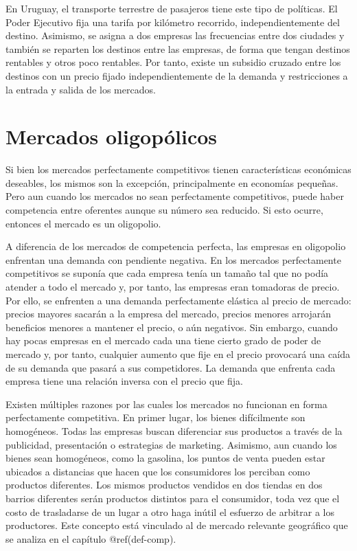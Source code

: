 \documentclass[
  12pt,
  spanish,
]{book}
\begin{document}
En Uruguay, el transporte terrestre de pasajeros tiene este tipo de
políticas. El Poder Ejecutivo fija una tarifa por kilómetro recorrido,
independientemente del destino. Asimismo, se asigna a dos empresas las
frecuencias entre dos ciudades y también se reparten los destinos entre
las empresas, de forma que tengan destinos rentables y otros poco
rentables. Por tanto, existe un subsidio cruzado entre los destinos con
un precio fijado independientemente de la demanda y restricciones a la
entrada y salida de los mercados.

\hypertarget{mercados-oligopuxf3licos}{%
\section{Mercados oligopólicos}\label{mercados-oligopuxf3licos}}

Si bien los mercados perfectamente competitivos tienen características
económicas deseables, los mismos son la excepción, principalmente en
economías pequeñas. Pero aun cuando los mercados no sean perfectamente
competitivos, puede haber competencia entre oferentes aunque su número
sea reducido. Si esto ocurre, entonces el mercado es un oligopolio.

A diferencia de los mercados de competencia perfecta, las empresas en
oligopolio enfrentan una demanda con pendiente negativa. En los mercados
perfectamente competitivos se suponía que cada empresa tenía un tamaño
tal que no podía atender a todo el mercado y, por tanto, las empresas
eran tomadoras de precio. Por ello, se enfrenten a una demanda
perfectamente elástica al precio de mercado: precios mayores sacarán a
la empresa del mercado, precios menores arrojarán beneficios menores a
mantener el precio, o aún negativos. Sin embargo, cuando hay pocas
empresas en el mercado cada una tiene cierto grado de poder de mercado
y, por tanto, cualquier aumento que fije en el precio provocará una
caída de su demanda que pasará a sus competidores. La demanda que
enfrenta cada empresa tiene una relación inversa con el precio que fija.

Existen múltiples razones por las cuales los mercados no funcionan en
forma perfectamente competitiva. En primer lugar, los bienes
difícilmente son homogéneos. Todas las empresas buscan diferenciar sus
productos a través de la publicidad, presentación o estrategias de
marketing. Asimismo, aun cuando los bienes sean homogéneos, como la
gasolina, los puntos de venta pueden estar ubicados a distancias que
hacen que los consumidores los perciban como productos diferentes. Los
mismos productos vendidos en dos tiendas en dos barrios diferentes serán
productos distintos para el consumidor, toda vez que el costo de
trasladarse de un lugar a otro haga inútil el esfuerzo de arbitrar a los
productores. Este concepto está vinculado al de mercado relevante
geográfico que se analiza en el capítulo @ref(def-comp).
\end{document}
